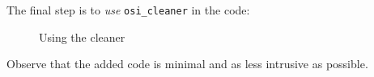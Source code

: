 The final step is to \emph{use} \texttt{osi\_cleaner} in the code:

\begin{figure}[t]
{\small{
\begin{minipage}[t]{0.5\linewidth}
 
\end{minipage}
\caption{\label{fig:securednew} Using the cleaner}
}}
\end{figure}

Observe that the added code is minimal and as less intrusive as possible.

